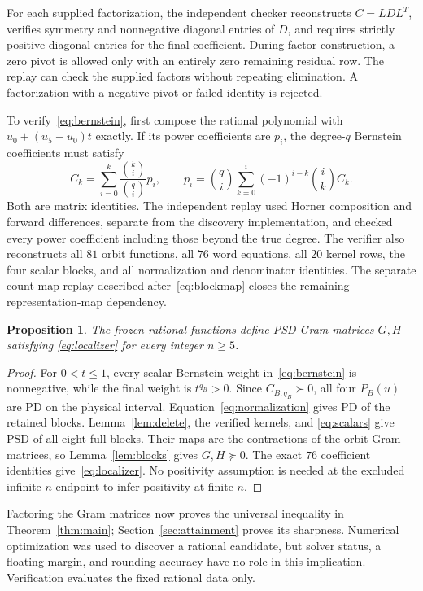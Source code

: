 \documentclass[11pt]{article}
\newtheorem{proposition}[theorem]{Proposition}
\begin{document}
For each supplied factorization, the independent checker reconstructs
$C=LDL^T$, verifies symmetry and nonnegative diagonal entries of $D$,
and requires strictly positive diagonal entries for the final coefficient.
During factor construction, a zero pivot is allowed only with an entirely
zero remaining residual row. The replay can check the supplied factors
without repeating elimination. A factorization with a negative pivot
or failed identity is rejected.

To verify~\eqref{eq:bernstein}, first compose the rational polynomial
with $u_0+(u_5-u_0)t$ exactly. If its power coefficients are $p_i$, the
degree-$q$ Bernstein coefficients must satisfy
\[
 C_k=\sum_{i=0}^k\frac{\binom{k}{i}}{\binom{q}{i}}p_i,
 \qquad
 p_i=\binom qi\sum_{k=0}^i(-1)^{i-k}\binom ik C_k.
\]
Both are matrix identities. The independent replay used Horner
composition and forward differences, separate from the discovery
implementation, and checked every power coefficient including those
beyond the true degree. The verifier also reconstructs all $81$ orbit
functions, all $76$ word equations, all $20$ kernel rows, the four
scalar blocks, and all normalization and denominator identities.
The separate count-map replay described after~\eqref{eq:blockmap}
closes the remaining representation-map dependency.

\begin{proposition}\label{prop:certificate}
The frozen rational functions define PSD Gram matrices $G,H$ satisfying
\eqref{eq:localizer} for every integer $n\ge5$.
\end{proposition}
\begin{proof}
For $0<t\le1$, every scalar Bernstein weight in~\eqref{eq:bernstein}
is nonnegative, while the final weight is $t^{q_B}>0$.
Since $C_{B,q_B}\succ0$, all four $P_B(u)$ are PD on the physical
interval. Equation~\eqref{eq:normalization} gives PD of the retained
blocks. Lemma~\ref{lem:delete}, the verified kernels, and
\eqref{eq:scalars} give PSD of all eight full blocks. Their maps are
the contractions of the orbit Gram matrices, so
Lemma~\ref{lem:blocks} gives $G,H\succeq0$.
The exact $76$ coefficient identities give~\eqref{eq:localizer}.
No positivity assumption is needed at the excluded infinite-$n$
endpoint to infer positivity at finite $n$.
\end{proof}
Factoring the Gram matrices now proves the universal inequality in
Theorem~\ref{thm:main}; Section~\ref{sec:attainment} proves its sharpness.
Numerical optimization was used to discover a rational candidate, but
solver status, a floating margin, and rounding accuracy have no role in
this implication. Verification evaluates the fixed rational data only.
\end{document}
